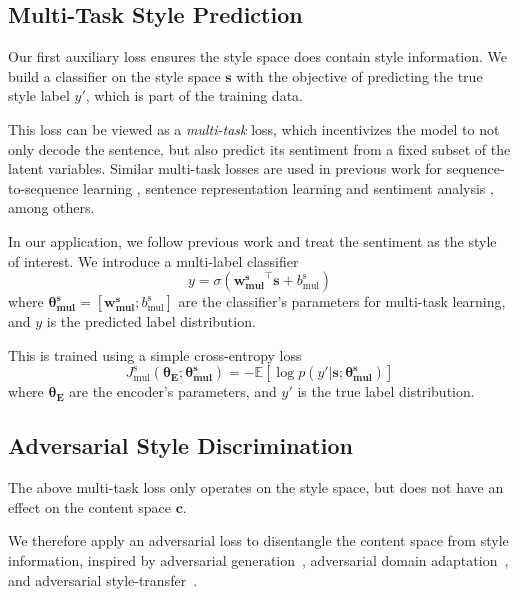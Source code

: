 \documentclass[letterpaper]{article} %
\newcommand{\loss}[2]{J_{\text{#1}}^{\text{#2}}}
\newcommand{\nnweight}[2]{\bm{\theta_{\text{#1}}^{\text{#2}}}}
\newcommand{\weight}[2]{\bm{w_{\text{#1}}^{\text{#2}}}}
\newcommand{\bias}[2]{b_{\text{#1}}^{\text{#2}}}
\begin{document}
\subsection{Multi-Task Style Prediction} \label{ssec:multitask-style-objective}

Our first auxiliary loss ensures the style space does contain style information.
We build a classifier on the style space $\bm s$ with the objective of predicting the true style label $y'$, which is part of the training data.

This loss can be viewed as a \textit{multi-task} loss, which incentivizes the model to not only decode the sentence, but also predict its sentiment from a fixed subset of the latent variables.
Similar multi-task losses are used in previous work for sequence-to-sequence learning \cite{luong2015multi}, sentence representation learning \cite{jernite2017discourse} and sentiment analysis \cite{balikas2017multitask}, among others.

In our application, we follow previous work \cite{hu2017toward,shen2017style,fu2017style} and treat the sentiment as the style of interest.
We introduce a multi-label classifier
\begin{equation} \label{eqn:class-pred}
	y = \sigma({\weight{mul}{s}}^\top \bm s + \bias{mul}{s})
\end{equation}
where $\nnweight{mul}{s}=[\weight{mul}{s}; \bias{mul}{s}]$ are the classifier's parameters for multi-task learning, and $y$ is the predicted label distribution.

This is trained using a simple cross-entropy loss
\begin{equation} \label{eqn:style-multi-task-loss}
	\loss{mul}{s}(\nnweight{E}{};\nnweight{mul}{s}) =
	- \mathbb{E} [\log p(y' | \bm s; \nnweight{mul}{s})]
\end{equation}
where $\nnweight{E}{}$ are the encoder's parameters, and $y'$ is the true label distribution.


\subsection{Adversarial Style Discrimination} \label{ssec:adversarial-style-objective}

The above multi-task loss only operates on the style space, but does not have an effect on the content space $\bm c$.

We therefore apply an adversarial loss to disentangle the content space from style information, inspired by adversarial generation~\cite{goodfellow2014generative}, adversarial domain adaptation~\cite{liu2017adversarial}, and adversarial style-transfer~\cite{shen2017style}.
\end{document}
